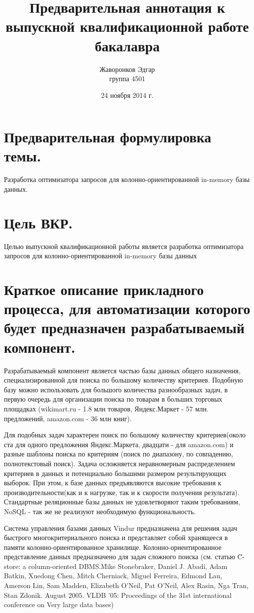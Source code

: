 \documentclass[12pt]{article}
\author{Жаворонков Эдгар \\ группа 4501}
\title{Предварительная аннотация к выпускной квалификационной работе бакалавра}
\date{24 ноября 2014 г.}
\begin{document}
    \section{Предварительная формулировка темы.}
        Разработка оптимизатора запросов для колонно-ориентированной in-memory базы данных.
    \section{Цель ВКР.}
        Целью выпускной квалификационной работы является разработка оптимизатора запросов для колонно-ориентированной in-memory базы данных
    \section{Краткое описание прикладного процесса, для автоматизации которого будет предназначен разрабатываемый компонент.}
        Разрабатываемый компонент является частью базы данных общего назначения, специализированной для поиска по большому количеству критериев. Подобную базу можно использовать для большого количества разнообразных задач, в первую очередь для организации поиска по товарам в больших торговых площадках (wikimart.ru - 1.8 млн товаров, Яндекс.Маркет - 57 млн. предложений, amazon.com - 36 млн книг).

        Для подобных задач характерен поиск по большому количеству критериев(около ста для одного предложения Яндекс.Маркета, двадцати - для amazon.com) и разные шаблоны поиска по критериям (поиск по диапазону, по совпадению, полнотекстовый поиск). Задача осложняется неравномерным распределением критериев в данных и потенциально большими размером результирующих выборок. При этом, к базе данных предъявляются высокие требования к производительности(как и к нагрузке, так и к скорости получения результата). Стандартные реляционные базы данных не удовлетворяют таким требованиям, NoSQL - так же не реализуют необходимую функциональность.

        Система управления базами данных Vindur предназначена для решения задач быстрого многокритериального поиска и представляет собой хранящееся в памяти колонно-ориентированное хранилище. Колонно-ориентированное представление данных предназначено для задач сложного поиска (см. статью \"C-store: a column-oriented DBMS.\" Mike Stonebraker, Daniel J. Abadi, Adam Batkin, Xuedong Chen, Mitch Cherniack, Miguel Ferreira, Edmond Lau, Amerson Lin, Sam Madden, Elizabeth O'Neil, Pat O'Neil, Alex Rasin, Nga Tran, Stan Zdonik. August 2005. VLDB '05: Proceedings of the 31st international conference on Very large data bases)     
\end{document}
